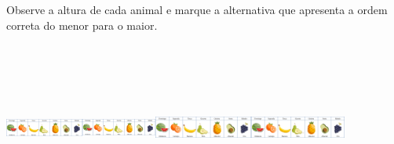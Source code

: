 \begin{escolha}
\begin{escolha}
{{{{{{{{Observe a altura de cada animal e marque a alternativa que apresenta a
ordem correta do menor para o maior.

\includegraphics[width=1.01000in,height=2.21875in]{media/image143.png}\includegraphics[width=0.97225in,height=2.21875in]{media/image143.png}\includegraphics[width=1.26550in,height=2.21875in]{media/image143.png}\includegraphics[width=1.24230in,height=2.21875in]{media/image143.png}

}}}}}}}}
\end{escolha}
\end{escolha}
